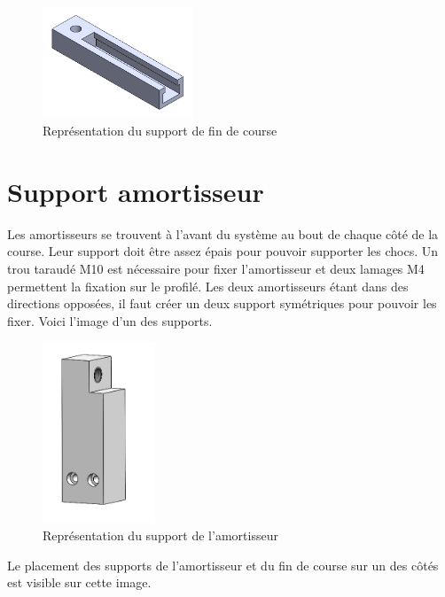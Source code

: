 \begin{figure}[H]
  \centering
  \includegraphics[width = 0.4\textwidth]{assets/figures/SupportFinCourse.png}
  \caption{Représentation du support de fin de course}
  \label{fig:SupFinCourse}
\end{figure}

\section{Support amortisseur}\label{sec:SupAmort}
Les amortisseurs se trouvent à l'avant du système au bout de chaque côté de la course. Leur support doit être assez épais pour pouvoir supporter
les chocs. Un trou taraudé M10 est nécessaire pour fixer l'amortisseur et deux lamages M4 permettent la fixation sur le profilé. Les deux amortisseurs
étant dans des directions opposées, il faut créer un deux support symétriques pour pouvoir les fixer. Voici l'image d'un des supports.

\begin{figure}[H]
  \centering
  \includegraphics[width = 0.3\textwidth]{assets/figures/SupportAmortisseur.png}
  \caption{Représentation du support de l'amortisseur}
  \label{fig:SupAmort}
\end{figure}

Le placement des supports de l'amortisseur et du fin de course sur un des côtés est visible sur cette image.

